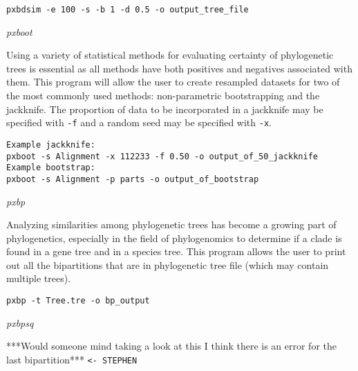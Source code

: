 \documentclass[12pt,letterpaper]{article}
\renewcommand{\subsection}[1]{%
\bigskip
\begin{center}
\begin{large}
\normalfont\itshape #1
\end{large}
\end{center}}
\begin{document}
\begin{flushleft}
\begin{verbatim}
pxbdsim -e 100 -s -b 1 -d 0.5 -o output_tree_file
\end{verbatim}
\end{flushleft}

\subsection{pxboot}

Using a variety of statistical methods for evaluating certainty of phylogenetic trees is essential as all methods have both positives and negatives associated with them. This program will allow the user to create resampled datasets for two of the most commonly used methods: non-parametric bootstrapping and the jackknife. The proportion of data to be incorporated in a jackknife may be specified with \texttt{-f} and a random seed may be specified with \texttt{-x}.
\begin{flushleft}
\begin{verbatim}
Example jackknife:
pxboot -s Alignment -x 112233 -f 0.50 -o output_of_50_jackknife
Example bootstrap:
pxboot -s Alignment -p parts -o output_of_bootstrap
\end{verbatim}
\end{flushleft}

\subsection{pxbp}

Analyzing similarities among phylogenetic trees has become a growing part of phylogenetics, especially in the field of phylogenomics to determine if a clade is found in a gene tree and in a species tree. This program allows the user to print out all the bipartitions that are in phylogenetic tree file (which may contain multiple trees).

\begin{flushleft}
\begin{verbatim}
pxbp -t Tree.tre -o bp_output
\end{verbatim}
\end{flushleft}


\subsection{pxbpsq}

***Would someone mind taking a look at this I think there is an error for the last bipartition*** \texttt{<- STEPHEN}
\end{document}
